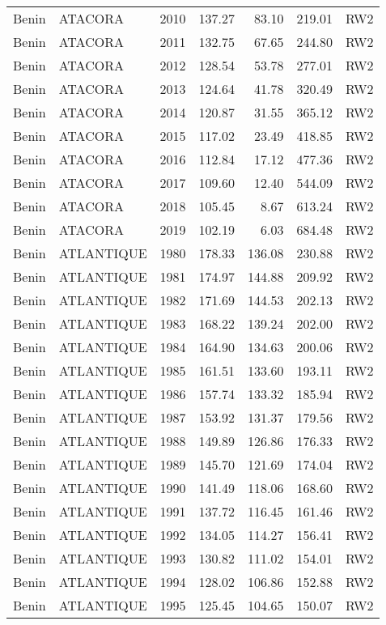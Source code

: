 \begin{longtable}{lllrrrl}
  Benin & ATACORA & 2010 & 137.27 & 83.10 & 219.01 & RW2 \\ 
  Benin & ATACORA & 2011 & 132.75 & 67.65 & 244.80 & RW2 \\ 
  Benin & ATACORA & 2012 & 128.54 & 53.78 & 277.01 & RW2 \\ 
  Benin & ATACORA & 2013 & 124.64 & 41.78 & 320.49 & RW2 \\ 
  Benin & ATACORA & 2014 & 120.87 & 31.55 & 365.12 & RW2 \\ 
  Benin & ATACORA & 2015 & 117.02 & 23.49 & 418.85 & RW2 \\ 
  Benin & ATACORA & 2016 & 112.84 & 17.12 & 477.36 & RW2 \\ 
  Benin & ATACORA & 2017 & 109.60 & 12.40 & 544.09 & RW2 \\ 
  Benin & ATACORA & 2018 & 105.45 & 8.67 & 613.24 & RW2 \\ 
  Benin & ATACORA & 2019 & 102.19 & 6.03 & 684.48 & RW2 \\ 
  Benin & ATLANTIQUE & 1980 & 178.33 & 136.08 & 230.88 & RW2 \\ 
  Benin & ATLANTIQUE & 1981 & 174.97 & 144.88 & 209.92 & RW2 \\ 
  Benin & ATLANTIQUE & 1982 & 171.69 & 144.53 & 202.13 & RW2 \\ 
  Benin & ATLANTIQUE & 1983 & 168.22 & 139.24 & 202.00 & RW2 \\ 
  Benin & ATLANTIQUE & 1984 & 164.90 & 134.63 & 200.06 & RW2 \\ 
  Benin & ATLANTIQUE & 1985 & 161.51 & 133.60 & 193.11 & RW2 \\ 
  Benin & ATLANTIQUE & 1986 & 157.74 & 133.32 & 185.94 & RW2 \\ 
  Benin & ATLANTIQUE & 1987 & 153.92 & 131.37 & 179.56 & RW2 \\ 
  Benin & ATLANTIQUE & 1988 & 149.89 & 126.86 & 176.33 & RW2 \\ 
  Benin & ATLANTIQUE & 1989 & 145.70 & 121.69 & 174.04 & RW2 \\ 
  Benin & ATLANTIQUE & 1990 & 141.49 & 118.06 & 168.60 & RW2 \\ 
  Benin & ATLANTIQUE & 1991 & 137.72 & 116.45 & 161.46 & RW2 \\ 
  Benin & ATLANTIQUE & 1992 & 134.05 & 114.27 & 156.41 & RW2 \\ 
  Benin & ATLANTIQUE & 1993 & 130.82 & 111.02 & 154.01 & RW2 \\ 
  Benin & ATLANTIQUE & 1994 & 128.02 & 106.86 & 152.88 & RW2 \\ 
  Benin & ATLANTIQUE & 1995 & 125.45 & 104.65 & 150.07 & RW2 \\ 

\end{longtable}
